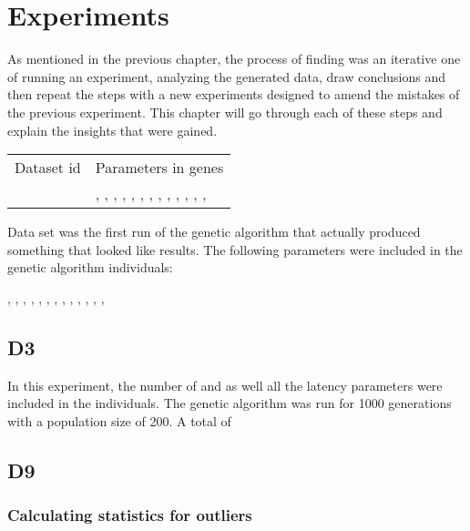\chapter{Experiments}
As mentioned in the previous chapter, the process of finding was an iterative one of running an experiment, analyzing the generated data, draw conclusions and then repeat the steps with a new experiments designed to amend the mistakes of the previous experiment. This chapter will go through each of these steps and explain the insights that were gained.

\begin{table}
	\centering
	\begin{tabular}{l|l}
	Dataset id & Parameters in genes\\
	\dthree & \sclatencymu, \sclatencys, \scnAgents, \scthinkmu, \scthinks, \sctimehorizonmu, \sctimehorizons, \scwaitTimeBetweenTradingmu, \scwaitTimeBetweenTradings, \ssmmlatencymu, \ssmmlatencys, \ssmmnAgents, \ssmmthinkmu, \ssmmthinks	
	\end{tabular}
\end{table}

Data set \dthree was the first run of the genetic algorithm that actually produced something that looked like results. The following parameters were included in the genetic algorithm individuals:
\begin{center}
\sclatencymu, \sclatencys, \scnAgents, \scthinkmu, \scthinks, \sctimehorizonmu, \sctimehorizons, \scwaitTimeBetweenTradingmu, \scwaitTimeBetweenTradings, \ssmmlatencymu, \ssmmlatencys, \ssmmnAgents, \ssmmthinkmu, \ssmmthinks
\end{center}

\section{D3}
In this experiment, the number of \ssmmnAgents and \scnAgents as well all the latency parameters were included in the individuals. The genetic algorithm was run for 1000 generations with a population size of 200. A total of 


\section{D9}

\subsection{Calculating statistics for outliers}

